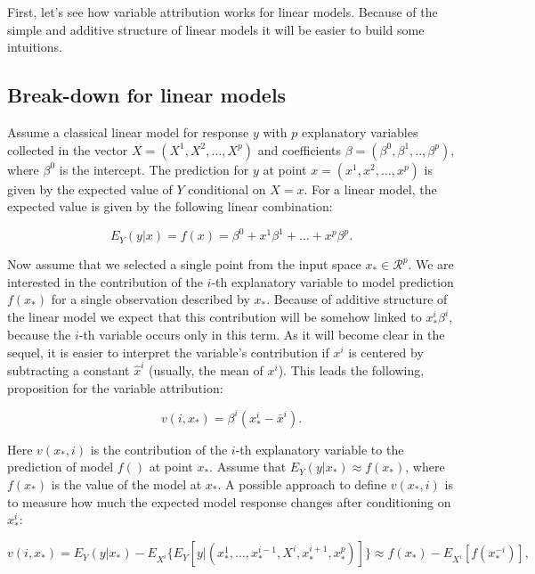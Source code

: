 \documentclass[]{krantz}
\begin{document}
First, let's see how variable attribution works for linear models. Because of the simple and additive structure of linear models it will be easier to build some intuitions.

\hypertarget{break-down-for-linear-models}{%
\subsection{Break-down for linear models}\label{break-down-for-linear-models}}

Assume a classical linear model for response \(y\) with \(p\) explanatory variables collected in the vector \(X = (X^1, X^2, \ldots, X^p)\) and coefficients \(\beta = (\beta^0, \beta^1, .., \beta^p)\), where \(\beta^0\) is the intercept. The prediction for \(y\) at point \(x=(x^1, x^2, \ldots, x^p)\) is given by the expected value of \(Y\) conditional on \(X=x\). For a linear model, the expected value is given by the following linear combination:

\[
E_Y(y | x) = f(x) = \beta^0 + x^1 \beta^1 + \ldots + x^p \beta^p.
\]

Now assume that we selected a single point from the input space \(x_* \in \mathcal R^p\).
We are interested in the contribution of the \(i\)-th explanatory variable to model prediction \(f(x_*)\) for a single observation described by \(x_*\). Because of additive structure of the linear model we expect that this contribution will be somehow linked to \(x_*^i\beta^i\), because the \(i\)-th variable occurs only in this term. As it will become clear in the sequel, it is easier to interpret the variable's contribution if \(x^i\) is centered by subtracting a constant \(\hat x^i\) (usually, the mean of \(x^i\)). This leads the following, proposition for the variable attribution:

\begin{equation}
v(i, x_*) = \beta^i (x^i_* - \bar x^i).
\label{eq:singleBreakDownContribution}
\end{equation}

Here \(v(x_*, i)\) is the contribution of the \(i\)-th explanatory variable to the prediction of model \(f()\) at point \(x_*\). Assume that \(E_Y(y | x_*) \approx f(x_*)\), where \(f(x_*)\) is the value of the model at \(x_*\). A possible approach to define \(v(x_*, i)\) is to measure how much the expected model response changes after conditioning on \(x^i_*\):

\begin{equation}
v(i, x_*) = E_Y(y | x_*) - E_{X^i}\{E_Y[y | (x^1_*,\ldots,x^{i-1}_*,X^i,x^{i+1}_*,x^p_*)]\}\approx f(x_*) - E_{X^i}[f(x^{-i}_*)],
\end{equation}
\end{document}
